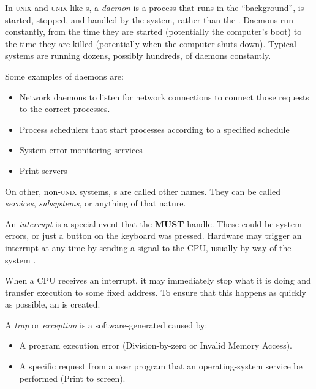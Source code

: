 \begin{definition}[Daemon]\label{def:Daemon}
  In \textsc{unix} and \textsc{unix}-like s, a \emph{daemon} is a  process that runs in the ``background'', is started, stopped, and handled by the system, rather than the .
  Daemons run constantly, from the time they are started (potentially the computer's boot) to the time they are killed (potentially when the computer shuts down).
  Typical systems are running dozens, possibly hundreds, of daemons constantly.

  Some examples of daemons are:
  \begin{itemize}[noitemsep]
  \item Network daemons to listen for network connections to connect those requests to the correct processes.
  \item Process schedulers that start processes according to a specified schedule
  \item System error monitoring services
  \item Print servers
  \end{itemize}

  \begin{remark}\label{rmk:Daemon_Other_Names}
    On other, non-\textsc{unix} systems, s are called other names.
    They can be called \emph{services}, \emph{subsystems}, or anything of that nature.
  \end{remark}
\end{definition}

\begin{definition}[Interrupt]\label{def:Interrupt}
  An \emph{interrupt} is a special event that the  \textbf{MUST} handle.
  These could be system errors, or just a button on the keyboard was pressed.
  Hardware may trigger an interrupt at any time by sending a signal to the CPU, usually by way of the system .

  When a CPU receives an interrupt, it may immediately stop what it is doing and transfer execution to some fixed address.
  To ensure that this happens as quickly as possible, an  is created.
\end{definition}

\begin{definition}[Trap]\label{def:Trap}
  A \emph{trap} or \emph{exception} is a software-generated  caused by:
  \begin{itemize}[noitemsep]
  \item A program execution error (Division-by-zero or Invalid Memory Access).
  \item A specific request from a user program that an operating-system service be performed (Print to screen).
  \end{itemize}
\end{definition}

